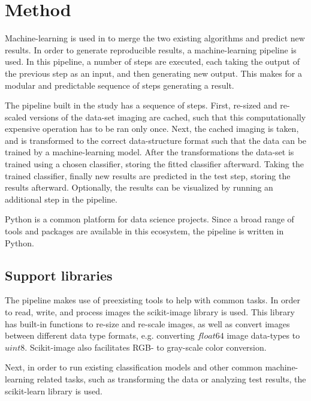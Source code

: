 
\section{Method}\label{sec:method}
Machine-learning is used in to merge the two existing algorithms and predict new results. In order to generate reproducible results, a machine-learning pipeline is used. In this pipeline, a number of steps are executed, each taking the output of the previous step as an input, and then generating new output. This makes for a modular and predictable sequence of steps generating a result.

The pipeline built in the study has a sequence of steps. First, re-sized and re-scaled versions of the data-set imaging are cached, such that this computationally expensive operation has to be ran only once. Next, the cached imaging is taken, and is transformed to the correct data-structure format such that the data can be trained by a machine-learning model. After the transformations the data-set is trained using a chosen classifier, storing the fitted classifier afterward. Taking the trained classifier, finally new results are predicted in the test step, storing the results afterward. Optionally, the results can be visualized by running an additional step in the pipeline.

Python is a common platform for data science projects. Since a broad range of tools and packages are available in this ecosystem, the pipeline is written in Python.

\subsection{Support libraries}
The pipeline makes use of preexisting tools to help with common tasks. In order to read, write, and process images the scikit-image library \citep{van2014scikit} is used. This library has built-in functions to re-size and re-scale images, as well as convert images between different data type formats, e.g. converting $float64$ image data-types to $uint8$. Scikit-image also facilitates RGB- to gray-scale color conversion.

Next, in order to run existing classification models and other common machine-learning related tasks, such as transforming the data or analyzing test results, the scikit-learn library \citep{scikit-learn} is used. 


